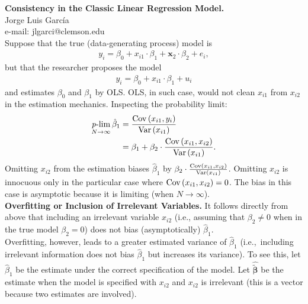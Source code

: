 
\let\counterwithout\relax
\let\counterwithin\relax
{}




\noindent \textbf{Consistency in the Classic Linear Regression Model.}\\
\noindent Jorge Luis García \\
\noindent e-mail: jlgarci@clemson.edu\\

 Suppose that the true (data-generating process) model is 
\begin{align}
	y_i = \beta_0 + x_{i1} \cdot \beta_1  + \bm{x}_{2} \cdot \beta_2 + e_i \label{real}, 
\end{align}
\noindent but that the researcher proposes the model 
\begin{align}
	y_i = \beta_0 + x_{i1} \cdot \beta_1 + u_i \label{real2} 
\end{align}
\noindent and estimates $\beta_0$ and $\beta_1$ by OLS. OLS, in such case, would not clean $x_{i1}$ from $x_{i2}$ in the estimation mechanics. Inspecting the probability limit: 
\begin{align}
	\operatorname*{\mathit{p}-lim}_{N \rightarrow \infty} \hat{\beta}_1 & = \frac{ \operatorname{Cov} \left( x_{i1}, y_{i} \right) } { \operatorname{Var} \left( x_{i1} \right) } \nonumber \\ 
	 & = \beta_1 + \beta_2 \cdot \frac{ \operatorname{Cov} \left( x_{i1}, x_{i2} \right) } { \operatorname{Var} \left( x_{i1} \right) }. 
\end{align} 
\noindent Omitting $x_{i2}$ from the estimation biases $\hat{\beta}_1$ by $\beta_2 \cdot \frac{ \operatorname{Cov} \left( x_{i1}, x_{i2} \right) } { \operatorname{Var} \left( x_{i1} \right) }$. Omitting $x_{i2}$ is innocuous only in the particular case where  $\operatorname{Cov} \left( x_{i1}, x_{i2} \right) = 0$. The bias in this case is asymptotic because it is limiting (when $N \rightarrow \infty$).\\

\noindent \textbf{Overfitting or Inclusion of Irrelevant Variables.} It follows directly from above that including an irrelevant variable $x_{i2}$ (i.e., assuming that $\beta_2 \neq 0$ when in the true model $\beta_2 = 0$) does not bias (asymptotically) $\hat{\beta}_1$.\\

\noindent Overfitting, however, leads to a greater estimated variance of $\hat{\beta}_1$ (i.e.,\ including irrelevant information does not bias $\hat{\beta}_1$ but increases its variance). To see this, let $\hat{\beta}_1$ be the estimate under the correct specification of the model. Let $\hat{\tilde{\bm{\beta}}}$ be the estimate when the model is specified with $x_{i2}$ and $x_{i2}$ is irrelevant (this is a vector because two estimates are involved). 

